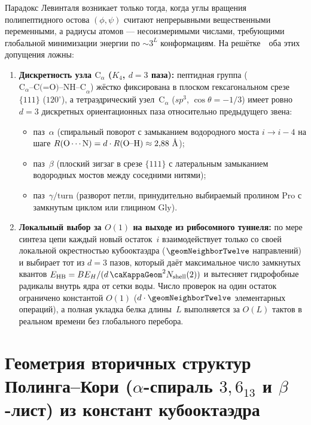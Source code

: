 Парадокс Левинталя возникает только тогда, когда углы вращения полипептидного остова $(\phi,\psi)$ считают непрерывными вещественными переменными, а радиусы атомов --- несоизмеримыми числами, требующими глобальной минимизации энергии по $\sim 3^L$ конформациям.
На решётке~\latGCKshort\ оба этих допущения ложны:
\begin{enumerate}[leftmargin=*]
\item \textbf{Дискретность узла $\text{C}_\alpha$ ($K_4$, $d=3$ паза):}
  пептидная группа ($\text{C}_\alpha\text{--C(=O)--NH--C}_\alpha$) жёстко фиксирована в плоском гексагональном срезе $\{111\}$ ($120^\circ$),
  а тетраэдрический узел~$\text{C}_\alpha$ ($sp^3$, $\cos\theta=-1/3$) имеет ровно $d=3$ дискретных ориентационных паза относительно предыдущего звена:
  \begin{itemize}[noitemsep]
  \item паз~$\alpha$ (спиральный поворот с замыканием водородного моста $i\to i-4$ на шаге $R(\text{O}\cdots\text{N})=d\cdot R(\text{O--H})\approx 2{,}88\ \text{\normalfont\AA}$);
  \item паз~$\beta$ (плоский зигзаг в срезе $\{111\}$ с латеральным замыканием водородных мостов между соседними нитями);
  \item паз~$\gamma/\text{turn}$ (разворот петли, принудительно выбираемый пролином $\text{Pro}$ с замкнутым циклом или глицином $\text{Gly}$).
  \end{itemize}
\item \textbf{Локальный выбор за $O(1)$ на выходе из рибосомного туннеля:}
  по мере синтеза цепи каждый новый остаток~$i$ взаимодействует только со своей локальной окрестностью кубооктаэдра ($\geomNeighborTwelve$ направлений) и выбирает тот из $d=3$ пазов, который даёт максимальное число замкнутых квантов $E_{\mathrm{HB}}=BE_H/(d\,\caKappaGeom^2 N_{\mathrm{shell}}(2))$ и вытесняет гидрофобные радикалы внутрь ядра от сетки воды.
  Число проверок на один остаток ограничено константой $O(1)$ ($d\cdot\geomNeighborTwelve$ элементарных операций), а полная укладка белка длины~$L$ выполняется за $O(L)$ тактов в реальном времени без глобального перебора.
\end{enumerate}

\section{Геометрия вторичных структур Полинга--Кори (\texorpdfstring{$\alpha$}{alpha}-спираль \texorpdfstring{$3{,}6_{13}$}{3.6\_13} и \texorpdfstring{$\beta$}{beta}-лист) из констант кубооктаэдра}
\label{sec:bio-pauling-corey}

